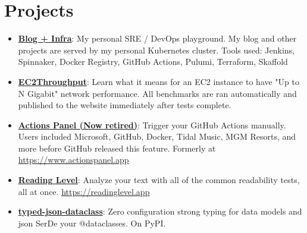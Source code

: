 \documentclass[letterpaper,11pt]{article}
\newcommand{\resumeItem}[2]{
  \item\small{
    \textbf{#1}{: #2 \vspace{-2pt}}
  }
}
\newcommand{\resumeSubItem}[2]{\resumeItem{#1}{#2}\vspace{-4pt}}
\newcommand{\resumeSubHeadingListStart}{\begin{itemize}[leftmargin=*]}
\newcommand{\resumeSubHeadingListEnd}{\end{itemize}}
\begin{document}
\section{Projects}
  \resumeSubHeadingListStart
  \resumeSubItem{\href{https://www.aaronbatilo.dev}{Blog + Infra}}
    {My personal SRE / DevOps playground. My blog and other projects are served by my
      personal Kubernetes cluster. Tools used: Jenkins, Spinnaker, Docker Registry, GitHub Actions, Pulumi, Terraform, Skaffold}
  \resumeSubItem{\href{https://ec2throughput.info}{EC2Throughput}}
    {Learn what it means for an EC2 instance to have "Up to N Gigabit" network
    performance. All benchmarks are ran automatically and published to the
    website immediately after tests complete.}
  \resumeSubItem{\href{https://www.actionspanel.app}{Actions Panel (Now retired)}}
  {Trigger your GitHub Actions manually. Users included Microsoft, GitHub, Docker, Tidal Music, MGM Resorts, and more before GitHub released this feature. Formerly at
      \href{https://www.actionspanel.app}{https://www.actionspanel.app}}
  \resumeSubItem{\href{https://www.readinglevel.app}{Reading Level}}
    {Analyze your text with all of the common readability tests, all at once.
      \href{https://www.readinglevel.app}{https://readinglevel.app}}
  \resumeSubItem{\href{https://pypi.org/project/typed-json-dataclass/}{typed-json-dataclass}}
    {Zero configuration strong typing for data models and json SerDe your @dataclasses. On PyPI.}
  \resumeSubHeadingListEnd
\end{document}
